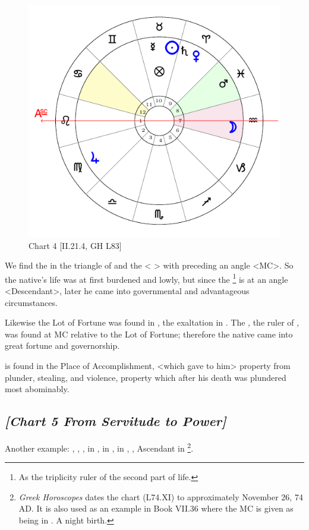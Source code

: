 \clearpage
\begin{figure}
\centering
\vspace{-20pt}
\includegraphics[width=.68\textwidth]{charts/2_21_4}
\caption{Chart 4 [II.21.4, GH L83]}
\label{fig:chart04}
\end{figure}

We find the \Sun\xspace in the triangle of \Venus\xspace and the \Moon\xspace <\Taurus\,\Virgo\,\Capricorn> with \Venus\xspace preceding an angle <MC>. So the native’s life was at first burdened and lowly, but since the \Moon\footnote{As the triplicity ruler of the second part of life.} is at an angle <Descendant>, later he came into governmental and advantageous circumstances. 

Likewise the Lot of Fortune was found in \Taurus, the exaltation in \Cancer. The \Moon, the ruler of \Cancer, was found at MC relative to the Lot of Fortune; therefore the native came into great fortune and governorship. 

\Mars\xspace is found in the Place of Accomplishment, <which gave to him> property from plunder, stealing, and violence, property which after his death was plundered most abominably.
\newpage
\subsection*{\textit{[Chart 5 From Servitude to Power]}}

Another example: \Sun, \Mercury, \Saturn, \Jupiter\xspace in \Sagittarius, \Moon\xspace in \Cancer, \Mars\xspace in \Virgo,
\Venus, Ascendant in \Libra
\footnote{\textit{Greek Horoscopes} dates the chart (L74.XI) to approximately November 26, 74 AD. It is also used as an example in Book VII.36 where the MC is given as being in \Cancer. A night birth.}.

